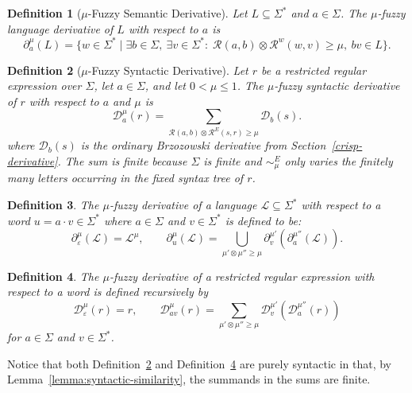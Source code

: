 \documentclass{article}
\newcommand{\cR}{{\mathcal R}}
\def\cut{\mu}
\newtheorem{definition}{Definition}[section]
\begin{document}
\begin{definition}[$\mu$-Fuzzy Semantic Derivative]\label{fuzzyderivative}
Let ${L}\subseteq\Sigma^*$ and $a\in\Sigma$. The \emph{$\cut$-fuzzy
language derivative} of ${L}$ with respect to $a$ is
$$
\partial_a^\cut({L})
=
\{w \in \Sigma^* \mid
  \exists b \in \Sigma,\ \exists v\in\Sigma^*
  :\;
  \cR(a,b)\otimes \mathcal{R}^w(w,v)\ge\cut,\ bv \in {L}
\}.
$$
\end{definition}

\begin{definition}[$\mu$-Fuzzy Syntactic Derivative]\label{def:regex-fuzzy-derivative}
Let $r$ be a restricted regular expression over $\Sigma$, let $a\in\Sigma$, and let
$0<\cut\le 1$. The \emph{$\mu$-fuzzy syntactic derivative} of $r$ with respect to $a$ and
$\cut$ is
\[
  \mathcal D_a^\cut(r)
  =
  \sum_{\mathcal R(a, b)\otimes \mathcal R^{E}( s, r)\geq \mu}
  \mathcal D_b(s).
\]
where $\mathcal D_b(s)$ is the ordinary Brzozowski derivative from
Section~\ref{crisp-derivative}. The sum is finite because $\Sigma$ is finite
and $\sim_\cut^E$ only varies the finitely many letters occurring in the fixed
syntax tree of $r$.
\end{definition}

\begin{definition}\label{def:fuzzy-word-derivative}
    The $\mu$-fuzzy derivative of a language $\mathcal{L} \subseteq \Sigma^*$ with respect to a word $u=a\cdot v \in \Sigma^*$ where $a \in \Sigma$ and $v \in \Sigma^*$ is defined to be:
    $$
    \partial^\cut_\varepsilon(\mathcal{L}) = \mathcal{L}^\cut,
    \qquad
    \partial^\cut_u(\mathcal{L}) = \bigcup_{\cut'\otimes \cut''\geq \cut}\partial^{\cut'}_v(\partial^{\cut''}_a(\mathcal{L})).
    $$
\end{definition}


\begin{definition}\label{def:regex-fuzzy-word-derivative}
The $\mu$-fuzzy derivative of a restricted regular expression with respect to a word is defined
recursively by
\[
  \mathcal D_\varepsilon^\cut(r)=r,
  \qquad
  \mathcal D_{av}^\cut(r)=\sum_{\mu'\otimes\mu''\geq \mu}\mathcal D_v^{\cut'}(\mathcal D_a^{\cut''}(r))
\]
for $a\in\Sigma$ and $v\in\Sigma^*$.
\end{definition}
Notice that both Definition~\ref{def:regex-fuzzy-derivative} and Definition~\ref{def:regex-fuzzy-word-derivative} are purely syntactic in that, by Lemma~\ref{lemma:syntactic-similarity}, the summands in the sums are finite. 
 
\end{document}
